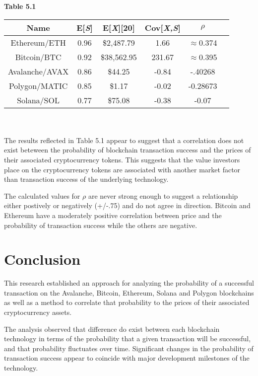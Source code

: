 \documentclass[12pt]{article}
\begin{document}
\textbf{Table 5.1}\\
\begin{tabular}{| c | c | c | c | c | c |}
\hline
\textbf{Name} & \textbf{E[\emph{S}]} & \textbf{E[\emph{X}]}[20] & \textbf{Cov[\emph{X,S}]} & \textbf{\emph{$\rho$}} \\
\hline
Ethereum/ETH & 0.96 & \$2,487.79 & 1.66 & $\approx$0.374 \\
Bitcoin/BTC  & 0.92 & \$38,562.95 & 231.67 & $\approx$0.395 \\
Avalanche/AVAX & 0.86 &\$44.25 & -0.84 & -.40268 \\
Polygon/MATIC & 0.85 &\$1.17 & -0.02 & -0.28673 \\
Solana/SOL & 0.77 & \$75.08 & -0.38 & -0.07 \\
\hline
\end{tabular}\\
\\

The results reflected in Table 5.1 appear to suggest that a correlation does not exist beteween the probability of blockchain transaction success and the prices of their associated cryptocurrency tokens. This suggests that the value investors place on the cryptocurrency tokens are associated with another market factor than transaction success of the underlying technology.

The calculated values for $\rho$ are never strong enough to suggest a relationship either postively or negatively (+/-.75) and do not agree in direction. Bitcoin and Ethereum have a moderately positive correlation between price and the probability of transaction success while the others are negative. 

\section{Conclusion}
This research established an approach for analyzing the probability of a successful transaction on the Avalanche, Bitcoin, Ethereum, Solana and Polygon blockchains as well as a method to correlate that probability to the prices of their associated cryptocurrency assets.

The analysis observed that difference do exist between each blockchain technology in terms of the probability that a given transaction will be successful, and that probability fluctuates over time. Significant changes in the probability of transaction success appear to coincide with major development milestones of the technology.
\end{document}
